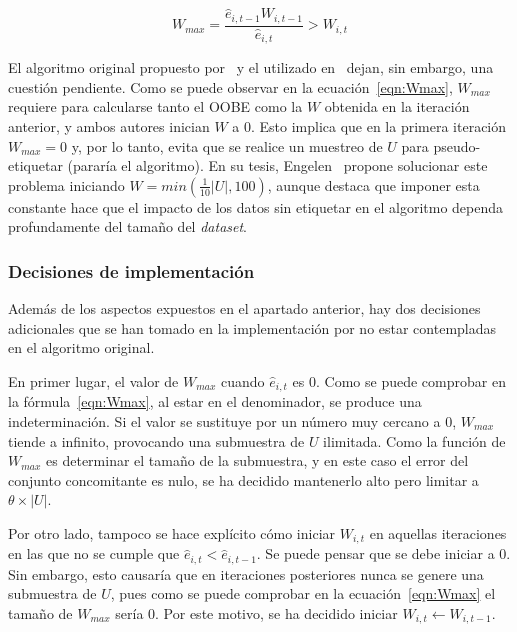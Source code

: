 \begin{equation}\label{eqn:Wmax} W_{max} = \frac{\hat{e}_{i,t-1}W_{i,t-1}}{\hat{e}_{i, t}} > W_{i,t} \end{equation}


\label{parag:Wmax_inicial} El algoritmo original propuesto por~\cite{originalCoForest2007} y el utilizado en~\cite{zhou2021SemisupervisedRecommendationAttack} dejan, sin embargo, una cuestión pendiente. Como se puede observar en la ecuación~\ref{eqn:Wmax}, $W_{max}$ requiere para calcularse tanto el OOBE como la $W$ obtenida en la iteración anterior, y ambos autores inician $W$ a 0. Esto implica que en la primera iteración $W_{max} = 0$ y, por lo tanto, evita que se realice un muestreo de $U$ para pseudo-etiquetar (pararía el algoritmo). En su tesis, Engelen~\cite{engelen2018thesis} propone solucionar este problema iniciando $W = min(\frac{1}{10}|U|, 100)$, aunque destaca que imponer esta constante hace que el impacto de los datos sin etiquetar en el algoritmo dependa profundamente del tamaño del \textit{dataset}.


\subsubsection{Decisiones de implementación}

Además de los aspectos expuestos en el apartado anterior, hay dos decisiones adicionales que se han tomado en la implementación por no estar contempladas en el algoritmo original.

En primer lugar, el valor de $W_{max}$ cuando $\hat{e}_{i, t}$  es $0$. Como se puede comprobar en la fórmula~\ref{eqn:Wmax}, al estar en el denominador, se produce una indeterminación. Si el valor se sustituye por un número muy cercano a 0, $W_{max}$ tiende a infinito, provocando una submuestra de $U$ ilimitada. Como la función de $W_{max}$ es determinar el tamaño de la submuestra, y en este caso el error del conjunto concomitante es nulo, se ha decidido mantenerlo alto pero limitar a $\theta\times|U|$.

Por otro lado, tampoco se hace explícito cómo iniciar $W_{i,t}$ en aquellas iteraciones en las que no se cumple que $\hat{e}_{i,t} < \hat{e}_{i,t-1}$. Se puede pensar que se debe iniciar a 0. Sin embargo, esto causaría que en iteraciones posteriores nunca se genere una submuestra de $U$, pues como se puede comprobar en la ecuación~\ref{eqn:Wmax} el tamaño de $W_{max}$ sería $0$. Por este motivo, se ha decidido iniciar $W_{i,t} \leftarrow W_{i,t-1}$.


